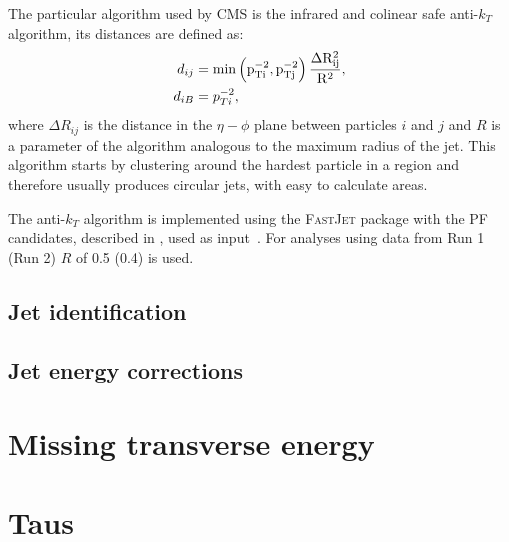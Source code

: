 The particular algorithm used by CMS is the infrared and colinear safe anti-$k_{T}$ algorithm, its distances are defined as:
\begin{align}
d_{ij}&=\rm{min}\left(p_{Ti}^{-2},p_{Tj}^{-2}\right)\frac{\Delta R_{ij}^{2}}{R^{2}},\\
d_{iB}&=p_{Ti}^{-2},
\end{align}
where $\Delta R_{ij}$ is the distance in the $\eta-\phi$ plane between particles $i$ and $j$ and $R$ is a parameter of the algorithm analogous to the maximum radius of the jet. This algorithm starts by clustering around the hardest particle in a region and therefore usually produces circular jets, with easy to calculate areas.

The anti-$k_{T}$ algorithm is implemented using the \textsc{FastJet} package with the \ac{PF} candidates, described in , used as input~\cite{Cacciari:fastjet1}. For analyses using data from \LHC Run 1 (Run 2) $R$ of 0.5 (0.4) is used.

\subsection{Jet identification}

\subsection{Jet energy corrections}

\section{Missing transverse energy}
\label{sec:MET}

\section{Taus}
\label{sec:taus}
